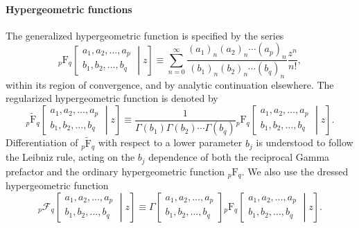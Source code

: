 \documentclass[a4paper,12pt]{article}
\begin{document}
\paragraph{Hypergeometric functions}
The generalized hypergeometric function is specified by the series
\begin{equation}
    {}_p\mathrm{F}_q\!\left[\begin{matrix}
        a_1,a_2,\ldots,a_p\\
        b_1,b_2,\ldots,b_q
    \end{matrix}\middle|z\right]
    \equiv\sum_{n=0}^{\infty}
    \frac{(a_1)_n(a_2)_n\cdots(a_p)_n}
    {(b_1)_n(b_2)_n\cdots(b_q)_n}\frac{z^n}{n!},
    \label{eq:useful-hypergeometric}
\end{equation}
within its region of convergence, and by analytic continuation elsewhere.
The regularized hypergeometric function is denoted by
\begin{equation}
    {}_p\widetilde{\mathrm{F}}_q\!\left[\begin{matrix}
        a_1,a_2,\ldots,a_p\\
        b_1,b_2,\ldots,b_q
    \end{matrix}\middle|z\right]
    \equiv\frac{1}{\Gamma(b_1)\Gamma(b_2)\cdots\Gamma(b_q)}
    {}_p\mathrm{F}_q\!\left[\begin{matrix}
        a_1,a_2,\ldots,a_p\\
        b_1,b_2,\ldots,b_q
    \end{matrix}\middle|z\right].
    \label{eq:useful-regularized-hypergeometric}
\end{equation}
Differentiation of ${}_p\widetilde{\mathrm{F}}_q$ with respect to a lower parameter $b_j$ is understood to follow the Leibniz rule, acting on the $b_j$ dependence of both the reciprocal Gamma prefactor and the ordinary hypergeometric function ${}_p\mathrm{F}_q$.
We also use the dressed hypergeometric function
\begin{equation}
    {}_p\mathcal{F}_q\!\left[\begin{matrix}
        a_1,a_2,\ldots,a_p\\
        b_1,b_2,\ldots,b_q
    \end{matrix}\middle|z\right]
    \equiv\Gamma\!\left[\begin{matrix}
        a_1,a_2,\ldots,a_p\\
        b_1,b_2,\ldots,b_q
    \end{matrix}\right]
    {}_p\mathrm{F}_q\!\left[\begin{matrix}
        a_1,a_2,\ldots,a_p\\
        b_1,b_2,\ldots,b_q
    \end{matrix}\middle|z\right].
    \label{eq:useful-dressed-hypergeometric}
\end{equation}
\end{document}

